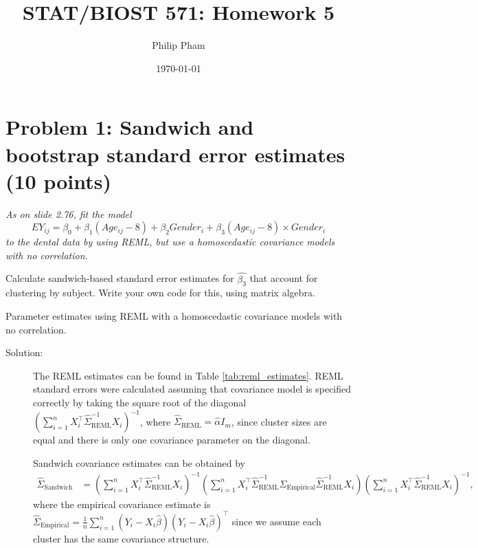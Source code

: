 \documentclass[11pt, letterpaper]{article}
\title{STAT/BIOST 571: Homework 5}
\author{Philip Pham}
\date{\today}
\begin{document}
\maketitle

\section*{Problem 1: Sandwich and bootstrap standard error estimates (10 points)}
{\em As on slide 2.76, fit the model
\[
EY_{ij}=\beta_0 +\beta_1(Age_{ij}-8)+\beta_2 Gender_i + \beta_3(Age_{ij} -8)\times Gender _i
\]
to the dental data by using REML, but use a homoscedastic covariance models with no correlation.}
\begin{enumerate}[(a)]
{\em \item Calculate sandwich-based standard error estimates for $\hat{\beta_3}$ that account for clustering by subject.  Write your
  own code for this, using matrix algebra.}

\begin{table}[h]
  \centering
  
  \caption{Parameter estimates using REML with a homoscedastic covariance models
    with no correlation.}
  \label{tab:reml_estimates}
\end{table}

\begin{description}
\item[Solution:] The REML estimates can be found in Table
  \ref{tab:reml_estimates}. REML standard errors were calculated assuming that
  covariance model is specified correctly by taking the square root of the
  diagonal
  $\left(\sum_{i=1}^n X_i^\intercal \hat{\Sigma}^{-1}_{\text{REML}}
    X_i\right)^{-1}$, where $\hat{\Sigma}_{\text{REML}} = \hat{\alpha} I_m$,
  since cluster sizes are equal and there is only one covariance parameter on
  the diagonal.
  
  Sandwich covariance estimates can be obtained by
  \begin{align*}
    \hat{\Sigma}_{\text{Sandwich}}
    &=
    \left(\sum_{i=1}^n X_i^\intercal \hat{\Sigma}^{-1}_{\text{REML}} X_i\right)^{-1}
    \left(\sum_{i=1}^n X_i^\intercal\hat{\Sigma}^{-1}_{\text{REML}}
      \hat{\Sigma}_{\text{Empirical}}
      \hat{\Sigma}^{-1}_{\text{REML}}X_i\right)
    \left(\sum_{i=1}^n X_i^\intercal \hat{\Sigma}^{-1}_{\text{REML}} X_i\right)^{-1},
  \end{align*}
  where the empirical covariance estimate is
  $\hat{\Sigma}_{\text{Empirical}} = \frac{1}{n}\sum_{i=1}^n \left(Y_i -
    X_i\hat{\beta}\right)\left(Y_i - X_i\hat{\beta}\right)^\intercal$ since we
  assume each cluster has the same covariance structure.


\end{description}
\end{enumerate}
\end{document}
